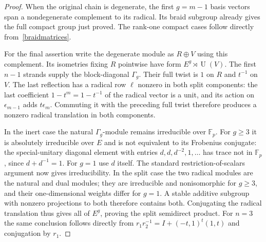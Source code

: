 \documentclass[11pt]{amsart}
\newcommand{\Fp}{\mathbb F_p}
\newcommand{\U}{\operatorname{U}}
\begin{document}
\begin{proof}
When the original chain is degenerate, the first $g=m-1$ basis
vectors span a nondegenerate complement to its radical. Its braid
subgroup already gives the full compact group just proved. The
rank-one compact cases follow directly from~\eqref{braidmatrices}.

For the final assertion write the degenerate module as $R\oplus V$
using this complement. Its isometries fixing $R$ pointwise have form
$E^g\rtimes\U(V)$. The first $n-1$ strands supply the block-diagonal
$\Gamma_g$. Their full twist is $1$ on $R$ and $t^{-1}$ on $V$.
The last reflection has a radical row $\ell$ nonzero in both split
components: the last coefficient $1-t^m=1-t^{-1}$ of the radical
vector is a unit, and its action on $\epsilon_{m-1}$ adds
$t\epsilon_m$. Commuting it with the preceding full twist therefore
produces a nonzero radical translation in both components.

In the inert case the natural $\Gamma_g$-module remains irreducible
over $\Fp$. For $g\ge3$ it is absolutely irreducible over $E$ and
is not equivalent to its Frobenius conjugate: the special-unitary
diagonal element with entries $d,d,d^{-2},1,\ldots$ has trace not in
$\Fp$, since $d+d^{-1}=1$. For $g=1$ use $d$ itself. The standard
restriction-of-scalars argument now gives irreducibility. In the
split case the two radical modules are the natural and dual modules;
they are irreducible and nonisomorphic for $g\ge3$, and their
one-dimensional weights differ for $g=1$. A stable additive subgroup
with nonzero projections to both therefore contains both. Conjugating
the radical translation thus gives all of $E^g$, proving the split
semidirect product. For $n=3$ the same conclusion follows directly
from $r_1r_2^{-1}=I+(-t,1)^t(1,t)$ and conjugation by $r_1$.
\end{proof}
\end{document}
